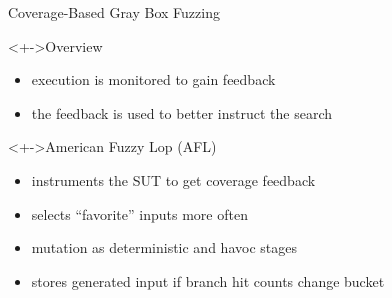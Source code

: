 \documentclass[\HandoutMode,table]{beamer}
\begin{document}
\begin{frame}
    {Coverage-Based Gray Box Fuzzing}
    \begin{block}<+->{Overview}
        \begin{itemize}
            \item{} execution is monitored to gain \alert{feedback}
            \item{} the feedback is used to better instruct the search
        \end{itemize}
    \end{block}
    \begin{exampleblock}<+->{American Fuzzy Lop (AFL)}
        \begin{itemize}
            \item{} instruments the SUT to get coverage feedback
            \item{} selects ``favorite'' inputs more often
            \item{} mutation as deterministic and havoc stages
            \item{} stores generated input if branch hit counts change bucket
        \end{itemize}
    \end{exampleblock}
\end{frame}
\end{document}
